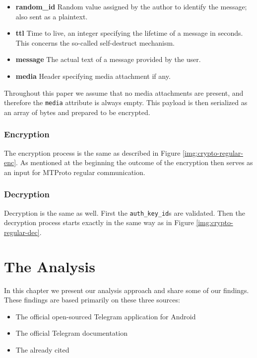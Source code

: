 \documentclass[thesis=M,english]{FITthesis}[2012/10/20]
\begin{document}
\begin{itemize}
	\item \textbf{random\_id} Random value assigned by the author to identify the message; also sent as a plaintext.
	\item  \textbf{ttl} Time to live, an integer specifying the lifetime of a message in seconds. This concerns the so-called self-destruct mechanism.
	\item \textbf{message} The actual text of a message provided by the user.
	\item \textbf{media} Header specifying media attachment if any.
\end{itemize}

Throughout this paper we assume that no media attachments are present, and therefore the \texttt{media} attribute is always empty. This payload is then serialized as an array of bytes and prepared to be encrypted.

\subsection{Encryption}\label{crypto-secret-enc}

The encryption process is the same as described in Figure \ref{img:crypto-regular-enc}. As mentioned at the beginning the outcome of the encryption then serves as an input for MTProto regular communication.

\subsection{Decryption}\label{crypto-secret-dec}

Decryption is the same as well. First the \texttt{auth\_key\_id}s are validated.  Then the decryption process starts exactly in the same way as in Figure \ref{img:crypto-regular-dec}.





\chapter{The Analysis}\label{analysis}

In this chapter we present our analysis approach and share some of our findings. These findings are based primarily on these three sources:

\begin{itemize}
	\item The official open-sourced Telegram application for Android
	\item The official Telegram documentation
	\item The already cited~\cite{telegram-aarhus}
\end{itemize}
\end{document}
